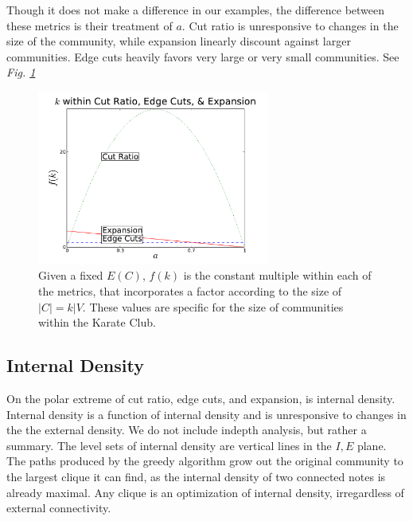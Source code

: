 \documentclass[conference]{IEEEtran}
\begin{document}
Though it does not make a difference in our examples, the difference between these metrics is their treatment of $a$.  Cut ratio is unresponsive to changes in the size of the community, while expansion linearly discount against larger communities.  Edge cuts heavily favors very large or very small communities.  See {\it Fig. \ref{fig_cuts_expansion_a}}

\begin{figure}[!h]
\centering
\includegraphics[width=3in]{Figures/cee_k}
\caption{Given a fixed $E(C)$, $f(k)$ is the constant multiple within each of the metrics, that incorporates a factor according to the size of $|C| = k|V$.  These values are specific for the size of communities within the Karate Club.}
\label{fig_cuts_expansion_a}
\end{figure}

\subsection{Internal Density}
On the polar extreme of cut ratio, edge cuts, and expansion, is internal density.  Internal density is a function of internal density and is unresponsive to changes in the the external density.  We do not include indepth analysis, but rather a summary.  The level sets of internal density are vertical lines in the $I,E$ plane.  The paths produced by the greedy algorithm grow out the original community to the largest clique it can find, as the internal density of two connected notes is already maximal.  Any clique is an optimization of internal density, irregardless of external connectivity.
\end{document}
